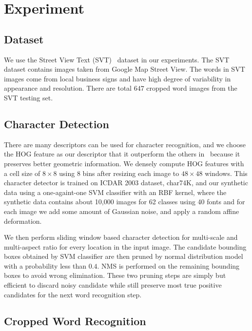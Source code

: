 \documentclass[10pt,twocolumn,letterpaper]{article}
\begin{document}
\section{Experiment}
\subsection{Dataset}

We use the Street View Text (SVT)~\cite{417} dataset in our experiments. The SVT dataset contains images taken from Google Map Street View. The words in SVT images come from local business signs and have high degree of variability in appearance and resolution. There are total $647$ cropped word images from the SVT testing set.

\subsection{Character Detection}

There are many descriptors can be used for character recognition, and we choose the HOG feature as our descriptor that it outperform the others in~\cite{117} because it preserves better geometric information. We densely compute HOG features with a cell size of $8 \times 8$ using $8$ bins after resizing each image to $48 \times 48$ windows. This character detector is trained on ICDAR 2003 dataset, char74K, and our synthetic data using a one-againt-one SVM classifier with an RBF kernel, where the synthetic data contains about 10,000 images for 62 classes using 40 fonts and for each image we add some amount of Gaussian noise, and apply a random affine deformation.

We then perform sliding window based character detection for multi-scale and multi-aspect ratio for every location in the input image. The candidate bounding boxes obtained by SVM classifier are then pruned by normal distribution model with a probability less than $0.4$. NMS is performed on the remaining bounding boxes to avoid wrong elimination. These two pruning steps are simply but efficient to discard noisy candidate while still preserve most true positive candidates for the next word recognition step.

\subsection{Cropped Word Recognition}
\end{document}
